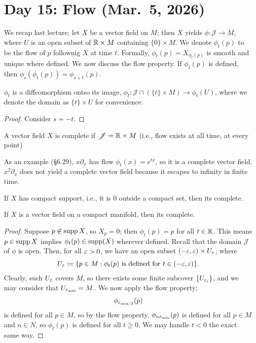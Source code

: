 \section{Day 15: Flow (Mar.\ 5, 2026)}
We recap last lecture; let $X$ be a vector field on $M$; then $X$ yields $\phi \colon \mathscr{J} \to M$, where $U$ is an open subset of $\mathbb R \times M$ containing $\{0\} \times M$. We denote $\phi_t(p)$ to be the flow of $p$ follownig $X$ at time $t$. Formally, $\phi_t(p) = X_{\phi_t(p)}$ is smooth and unique where defined. We now discuss the flow property. If $\phi_t(p)$ is defined, then $\phi_s(\phi_t(p)) = \phi_{s+t}(p)$.
\begin{corollary}
    $\phi_t$ is a diffeomorphism ontso its image, $\phi_t \colon \mathscr J \cap (\{t\} \times M) \to \phi_t(U)$, where we denote the domain as $\{t\} \times U$ for convenience.
\end{corollary}
\begin{proof}
    Consider $s = -t$.
\end{proof}
\begin{definition}
    A vector field $X$ is complete if $\mathscr J = \mathbb R \times M$ (i.e., flow exists at all time, at every point)
\end{definition}
As an example (\S6.29), $x \partial_x$ has flow $\phi_t(x) = e^{tx}$, so it is a complete vector field. $x^2 \partial_x$ does not yield a complete vector field because it escapes to infinity in finite time.
\begin{theorem}[\S6.32]
    If $X$ has compact support, i.e., it is $0$ outside a compact set, then its complete.
\end{theorem}
\begin{corollary}
    If $X$ is a vector field on a compact manifold, then its complete.
\end{corollary}
\begin{proof}
    Suppose $p \not\in \operatorname{supp} X$, so $X_p = 0$; then $\phi_t(p) = p$ for all $t \in \mathbb R$. This means $p \in \operatorname{supp} X$ implies $\phi_t(p) \in \operatorname{supp}(X)$ wherever defined. Recall that the domain $\mathscr J$ of $\phi$ is open. Then, for all $\varepsilon > 0$, we have an open subset $(-\varepsilon, \varepsilon) \times U_\varepsilon$, where
    \[ U_\varepsilon \coloneq \{p \in M : \phi_t(p) \text{ is defined for } t \in (-\varepsilon, \varepsilon)\}. \]
    Clearly, such $U_\varepsilon$ covers $M$, so there exists some finite subcover $\{U_{\varepsilon_i}\}$, and we may consider that $U_{\varepsilon_\text{min}} = M$. We now apply the flow property;
    \[ \phi_{\varepsilon_{\text{min}/2}}(p) \]
    is defined for all $p \in M$, so by the flow property, $\phi_{n \varepsilon_{\text{min}}}(p)$ is defined for all $p \in M$ and $n \in N$, so $\phi_t(p)$ is defined for all $t \geq 0$. We may handle $t < 0$ the exact same way.
\end{proof}
